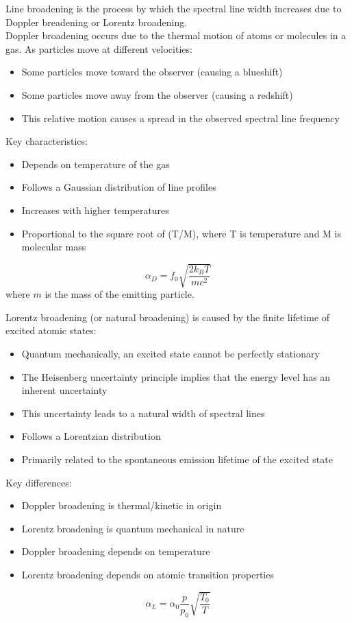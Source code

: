 \documentclass[12pt, a4paper]{article} %
\begin{document}
Line broadening is the process by which the spectral line width increases due to Doppler breadening or Lorentz broadening. \\

Doppler broadening occurs due to the thermal motion of atoms or molecules in a gas. As particles move at different velocities:
\begin{itemize}
    \item Some particles move toward the observer (causing a blueshift)
    \item Some particles move away from the observer (causing a redshift)
    \item This relative motion causes a spread in the observed spectral line frequency
\end{itemize}

Key characteristics:
\begin{itemize}
    \item Depends on temperature of the gas
    \item Follows a Gaussian distribution of line profiles
    \item Increases with higher temperatures
    \item Proportional to the square root of (T/M), where T is temperature and M is molecular mass
\end{itemize}

\begin{equation}
    \alpha_D = f_0 \sqrt{\frac{2k_B T}{mc^2}}
\end{equation}
where $m$ is the mass of the emitting particle.

Lorentz broadening (or natural broadening) is caused by the finite lifetime of excited atomic states:
\begin{itemize}
    \item Quantum mechanically, an excited state cannot be perfectly stationary
    \item The Heisenberg uncertainty principle implies that the energy level has an inherent uncertainty
    \item This uncertainty leads to a natural width of spectral lines
    \item Follows a Lorentzian distribution
    \item Primarily related to the spontaneous emission lifetime of the excited state
\end{itemize}

Key differences:
\begin{itemize}
    \item Doppler broadening is thermal/kinetic in origin
    \item Lorentz broadening is quantum mechanical in nature
    \item Doppler broadening depends on temperature
    \item Lorentz broadening depends on atomic transition properties
\end{itemize}
\begin{equation}
    \alpha_L = \alpha_0 \frac{p}{p_0} \sqrt{\frac{T_0}{T}}
\end{equation}
\end{document}

